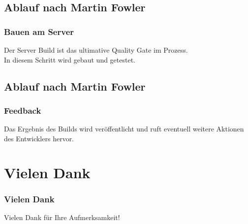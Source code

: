 \documentclass[hyperref={pdfpagelabels=false}]{beamer}
\begin{document}
\subsection{Ablauf nach Martin Fowler}
\begin{frame} [t]
\frametitle{Bauen am Server}
\begin{figure}[h]
  \centering
\end{figure}
\vspace{0.5cm} 
Der Server Build ist das ultimative Quality Gate im Prozess.\\
In diesem Schritt wird gebaut und getestet.
\end{frame}

\subsection{Ablauf nach Martin Fowler}
\begin{frame} [t]
\frametitle{Feedback}
\begin{figure}[h]
  \centering
\end{figure}
\vspace{0.5cm} 
Das Ergebnis des Builds wird veröffentlicht und ruft eventuell weitere Aktionen des Entwicklers hervor.
\end{frame}

\section*{Vielen Dank}

\begin{frame} 
\frametitle{Vielen Dank}

\begin{center}
\Huge{Vielen Dank für Ihre Aufmerksamkeit!}
\end{center}

\end{frame}
\end{document}

